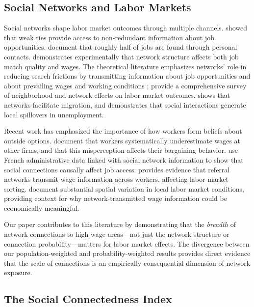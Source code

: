 \documentclass[12pt]{article}
\begin{document}
\subsection{Social Networks and Labor Markets}

Social networks shape labor market outcomes through multiple channels. \citet{granovetter1973strength} showed that weak ties provide access to non-redundant information about job opportunities. \citet{ioannides2004job} document that roughly half of jobs are found through personal contacts. \citet{beaman2012networks} demonstrates experimentally that network structure affects both job match quality and wages. The theoretical literature emphasizes networks' role in reducing search frictions by transmitting information about job opportunities \citep{calvo2004effects} and about prevailing wages and working conditions \citep{brown2016firms}; \citet{topa2017networks} provide a comprehensive survey of neighborhood and network effects on labor market outcomes. \citet{munshi2003networks} shows that networks facilitate migration, and \citet{topa2001social} demonstrates that social interactions generate local spillovers in unemployment.

Recent work has emphasized the importance of how workers form beliefs about outside options. \citet{jager2024worker} document that workers systematically underestimate wages at other firms, and that this misperception affects their bargaining behavior. \citet{kramarz2023} use French administrative data linked with social network information to show that social connections causally affect job access. \citet{schmutte2015} provides evidence that referral networks transmit wage information across workers, affecting labor market sorting. \citet{klinemoretti2014} document substantial spatial variation in local labor market conditions, providing context for why network-transmitted wage information could be economically meaningful.

Our paper contributes to this literature by demonstrating that the \textit{breadth} of network connections to high-wage areas---not just the network structure or connection probability---matters for labor market effects. The divergence between our population-weighted and probability-weighted results provides direct evidence that the scale of connections is an empirically consequential dimension of network exposure.

\subsection{The Social Connectedness Index}
\end{document}
